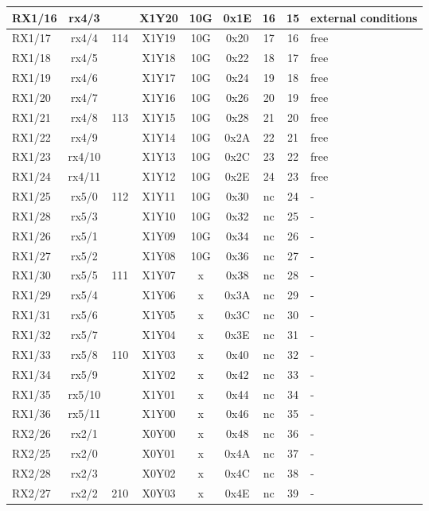 \begin{longtable}{|l|c|c|c|c|c|c|c|l|}
RX1/16 & rx4/3  &     & X1Y20 & 10G & 0x1E & 16 & 15 & external conditions\\\hline
RX1/17 & rx4/4  & 114 & X1Y19 & 10G & 0x20 & 17 & 16 & free\\\hline
RX1/18 & rx4/5  &     & X1Y18 & 10G & 0x22 & 18 & 17 & free\\\hline
RX1/19 & rx4/6  &     & X1Y17 & 10G & 0x24 & 19 & 18 & free\\\hline
RX1/20 & rx4/7  &     & X1Y16 & 10G & 0x26 & 20 & 19 & free\\\hline
RX1/21 & rx4/8  & 113 & X1Y15 & 10G & 0x28 & 21 & 20 & free\\\hline
RX1/22 & rx4/9  &     & X1Y14 & 10G & 0x2A & 22 & 21 & free\\\hline
RX1/23 & rx4/10 &     & X1Y13 & 10G & 0x2C & 23 & 22 & free\\\hline
RX1/24 & rx4/11 &     & X1Y12 & 10G & 0x2E & 24 & 23 & free\\\hline
RX1/25 & rx5/0  & 112 & X1Y11 & 10G & 0x30 & nc & 24 & -\\\hline
RX1/28 & rx5/3  &     & X1Y10 & 10G & 0x32 & nc & 25 & -\\\hline
RX1/26 & rx5/1  &     & X1Y09 & 10G & 0x34 & nc & 26 & -\\\hline
RX1/27 & rx5/2  &     & X1Y08 & 10G & 0x36 & nc & 27 & -\\\hline
RX1/30 & rx5/5  & 111 & X1Y07 &  x  & 0x38 & nc & 28 & -\\\hline
RX1/29 & rx5/4  &     & X1Y06 &  x  & 0x3A & nc & 29 & -\\\hline
RX1/31 & rx5/6  &     & X1Y05 &  x  & 0x3C & nc & 30 & -\\\hline
RX1/32 & rx5/7  &     & X1Y04 &  x  & 0x3E & nc & 31 & -\\\hline
RX1/33 & rx5/8  & 110 & X1Y03 &  x  & 0x40 & nc & 32 & -\\\hline
RX1/34 & rx5/9  &     & X1Y02 &  x  & 0x42 & nc & 33 & -\\\hline
RX1/35 & rx5/10 &     & X1Y01 &  x  & 0x44 & nc & 34 & -\\\hline
RX1/36 & rx5/11 &     & X1Y00 &  x  & 0x46 & nc & 35 & -\\\hline
RX2/26 & rx2/1  &     & X0Y00 &  x  & 0x48 & nc & 36 & -\\\hline
RX2/25 & rx2/0  &     & X0Y01 &  x  & 0x4A & nc & 37 & -\\\hline
RX2/28 & rx2/3  &     & X0Y02 &  x  & 0x4C & nc & 38 & -\\\hline
RX2/27 & rx2/2  & 210 & X0Y03 &  x  & 0x4E & nc & 39 & -\\\hline

\end{longtable}
